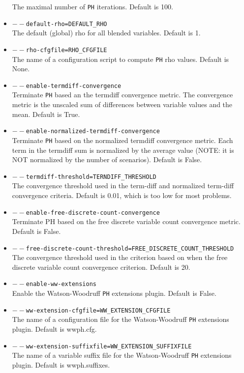 \documentclass[a4paper]{article}
\begin{document}
\begin{itemize}
	The maximal number of \texttt{PH} iterations. Default is 100.
	\item \texttt{$--$default-rho=DEFAULT\_RHO}\\
	The default (global) rho for all blended variables. Default is 1. 
	\item \texttt{$--$rho-cfgfile=RHO\_CFGFILE}\\
	The name of a configuration script to compute \texttt{PH} rho values. Default is None. 
	\item \texttt{$--$enable-termdiff-convergence}\\
	Terminate \texttt{PH} based an the termdiff convergence metric. The convergence metric is the unscaled sum of differences between variable values and the mean. Default is True. 
	\item \texttt{$--$enable-normalized-termdiff-convergence}\\
	Terminate \texttt{PH} based on the normalized termdiff convergence metric. Each term in the termdiff sum is normalized by the average value (NOTE: it is NOT normalized by the number of scenarios). Default is False. 
	\item \texttt{$--$termdiff-threshold=TERNDIFF\_THRESHOLD}\\
	The convergence threshold used in the term-diff and normalized term-diff convergence criteria. Default is 0.01, which is too low for most problems. 
	\item \texttt{$--$enable-free-discrete-count-convergence}\\
	Terminate PH based on the free discrete variable count convergence \mbox{metric}. Default is False. 
	\item \texttt{$--$free-discrete-count-threshold=FREE\_DISCRETE\_COUNT\_THRESHOLD}\\
	The convergence threshold used in the criterion based on when the free discrete variable count convergence criterion. Default is 20. 
	\item \texttt{$--$enable-ww-extensions}\\
	Enable the Watson-Woodruff \texttt{PH} extensions plugin. Default is False.
	\item \texttt{$--$ww-extension-cfgfile=WW\_EXTENSION\_CFGFILE}\\
	The name of a configuration file for the Watson-Woodruff \texttt{PH} extensions plugin. Default is wwph.cfg.
	\item \texttt{$--$ww-extension-suffixfile=WW\_EXTENSION\_SUFFIXFILE}\\
	The name of a variable suffix file for the Watson-Woodruff \texttt{PH} extensions plugin. Default is wwph.suffixes.

\end{itemize}
\end{document}
